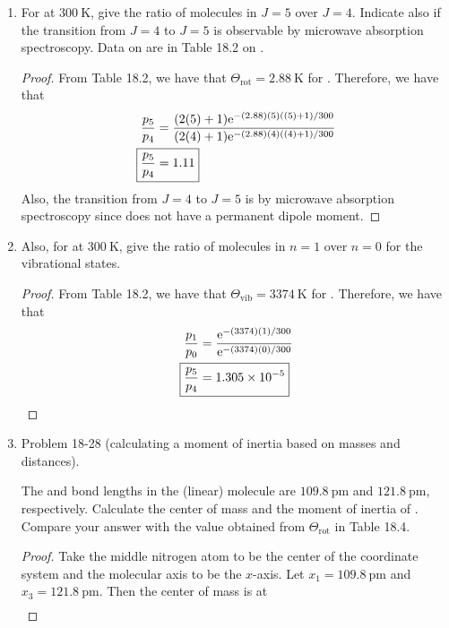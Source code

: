 \documentclass[../psets.tex]{subfiles}
\begin{document}
\begin{enumerate}
\begin{enumerate}
        \item For  at $\SI{300}{\kelvin}$, give the ratio of molecules in $J=5$ over $J=4$. Indicate also if the transition from $J=4$ to $J=5$ is observable by microwave absorption spectroscopy. Data on  are in Table 18.2 on \textcite[739]{bib:McQuarrieSimon}.
        \begin{proof}
            From Table 18.2, we have that $\Theta_\text{rot}=\SI{2.88}{\kelvin}$ for . Therefore, we have that
            \begin{align*}
                \frac{p_5}{p_4} &= \frac{(2(5)+1)\e[-(2.88)(5)((5)+1)/300]}{(2(4)+1)\e[-(2.88)(4)((4)+1)/300]}\\
                \Aboxed{\frac{p_5}{p_4} &= 1.11}
            \end{align*}
            Also, the transition from $J=4$ to $J=5$ is  by microwave absorption spectroscopy since  does not have a permanent dipole moment.
        \end{proof}
        \item Also, for  at $\SI{300}{\kelvin}$, give the ratio of molecules in $n=1$ over $n=0$ for the vibrational states.
        \begin{proof}
            From Table 18.2, we have that $\Theta_\text{vib}=\SI{3374}{\kelvin}$ for . Therefore, we have that
            \begin{align*}
                \frac{p_1}{p_0} &= \frac{\e[-(3374)(1)/300]}{\e[-(3374)(0)/300]}\\
                \Aboxed{\frac{p_5}{p_4} &= \num{1.305e-5}}
            \end{align*}
        \end{proof}
        \item Problem 18-28 (calculating a moment of inertia based on masses and distances).\par
        The  and  bond lengths in the (linear) molecule  are $\SI{109.8}{\pico\meter}$ and $\SI{121.8}{\pico\meter}$, respectively. Calculate the center of mass and the moment of inertia of . Compare your answer with the value obtained from $\Theta_\text{rot}$ in Table 18.4.
        \begin{proof}
            Take the middle nitrogen atom to be the center of the coordinate system and the molecular axis to be the $x$-axis. Let $x_1=\SI{109.8}{\pico\meter}$ and $x_3=\SI{121.8}{\pico\meter}$. Then the center of mass is at
            \begin{align*}

\end{align*}
\end{proof}
\end{enumerate}
\end{enumerate}
\end{document}
